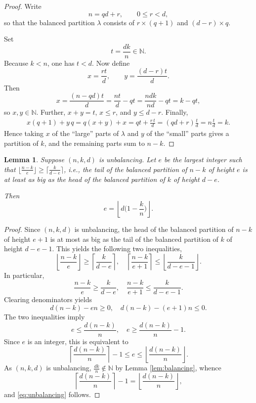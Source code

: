 \documentclass[12pt,dvipsnames,accepted=2016-08-18,a4paper,onecolumn]{quantumarticle}
\def\la{\lambda}
\def\la{\lambda}
\numberwithin{equation}{section}
\newcommand{\N}{\mathbb N}
\newtheorem{lemma}[theorem]{Lemma}
\theoremstyle{definition}
\begin{document}
\begin{proof}
Write
\[
n = qd + r,
\qquad
0 \le r < d,
\]
so that the balanced partition $\lambda$ 
consists of $r\times (q+1)$ and $(d-r)\times q$.

Set $$t=\frac{dk}{n}\in\mathbb{N}.$$
Because $k< n$, one has $t<d$.  Now define
\[
x =\frac{rt}{d},
\qquad
y =\frac{(d-r)t}{d}.
\]
Then \[
    x=\frac{(n-qd)t}{d}= \frac{nt}d-qt=\frac{n dk}{nd}-qt=k-qt,
\]
 so $x,y\in\mathbb{N}$. Further, $x+y=t$, $x\le r$, and $y\le d-r$.  Finally,
\begin{align*}
x(q+1)+y\,q
= q(x+y)+x 
= qt + \frac{r\,t}{d} 
= (qd+r)\frac{t}{d} 
= n\frac{t}{d} 
= k.
\end{align*}
Hence taking $x$ of the ``large'' parts of $\la$ and $y$ of the ``small'' parts gives a partition of $k$, and the remaining parts sum to $n-k$.
\end{proof}




\begin{lemma}\label{lem:unbalancing}
Suppose $(n,k,d)$ is unbalancing. 
Let $e$ be the largest integer such that  
$\lfloor \frac{n-k}{e}\rfloor \ge \lceil\frac{k}{d-e}\rceil$, i.e., the tail of the balanced partition of $n-k$ of height $e$
is at least as big as the head of the balanced partition of $k$ of height $d-e$.

Then \begin{equation}\label{eq:unbalancing}
e=\left\lfloor d \Big(1-\frac kn\Big)\right\rfloor.
\end{equation}
\end{lemma}


\begin{proof}
Since $(n,k,d)$ is unbalancing, the head of the balanced partition of $n-k$ of height $e+1$
is at most as big as the tail of the balanced partition of $k$ of height $d-e-1$. This yields the following two inequalities,
\[
\left\lfloor \frac{n-k}{e}\right\rfloor \ge \left\lceil\frac{k}{d-e}\right\rceil,
\quad
    \left\lceil \frac{n-k}{e+1}\right\rceil \le \left\lfloor\frac{k}{d-e-1}\right\rfloor.
\]
In particular,
\[
     \frac{n-k}{e} \ge \frac{k}{d-e},
\quad
     \frac{n-k}{e+1} \le \frac{k}{d-e-1}.
\]
Clearing denominators yields
\[
    d (n-k)-e n\geq0, \quad 
    d (n-k)-(e+1) n \leq0.
\]
The two inequalities imply
\[
    e\leq \frac{d(n-k)}n, \quad
    e \geq \frac{d(n-k)}n-1.
\]
Since $e$ is an integer, this is equivalent to
\[
       \left\lceil\frac{d(n-k)}n\right\rceil-1\leq 
       e\leq \left\lfloor\frac{d(n-k)}n\right\rfloor.
\]
As $(n,k,d)$ is unbalancing, $\frac{dk}n\not\in\N$ by Lemma \ref{lem:balancing},
whence
\[
\left\lceil\frac{d(n-k)}n\right\rceil-1=
\left\lfloor\frac{d(n-k)}n\right\rfloor,
\]
and \eqref{eq:unbalancing} follows.
\end{proof}
\end{document}

